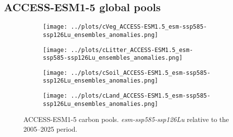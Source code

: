 \documentclass[]{article}
\begin{document}

\subsection{ACCESS-ESM1-5 global pools}

\begin{figure}[H]
    \centering
    \begin{subfigure}[b]{0.4\linewidth}
        \texttt{[image: ../plots/cVeg\_ACCESS-ESM1.5\_esm-ssp585-ssp126Lu\_ensembles\_anomalies.png]}
    \end{subfigure}
    \begin{subfigure}[b]{0.4\linewidth}
        \texttt{[image: ../plots/cLitter\_ACCESS-ESM1.5\_esm-ssp585-ssp126Lu\_ensembles\_anomalies.png]}
    \end{subfigure}
    \begin{subfigure}[b]{0.4\linewidth}
        \texttt{[image: ../plots/cSoil\_ACCESS-ESM1.5\_esm-ssp585-ssp126Lu\_ensembles\_anomalies.png]}
    \end{subfigure}
\begin{subfigure}[b]{0.4\linewidth}
        \texttt{[image: ../plots/cLand\_ACCESS-ESM1.5\_esm-ssp585-ssp126Lu\_ensembles\_anomalies.png]}
    \end{subfigure}
    \caption{ACCESS-ESM1-5 carbon pools. \textit{esm-ssp585-ssp126Lu} relative to the 2005--2025 period.}
    \label{fig:access_cpools}
\end{figure}
\end{document}
